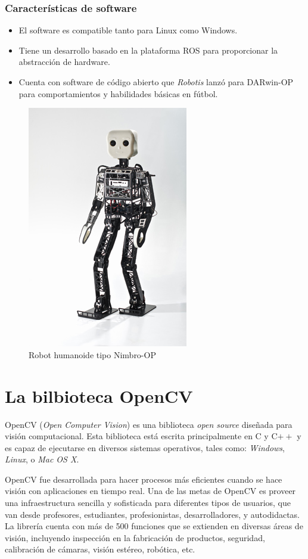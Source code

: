 	\subsubsection*{Características de software}
	\begin{itemize}
	\item El software es compatible tanto para Linux como Windows.
	\item Tiene un desarrollo basado en la plataforma ROS para proporcionar la abstracción de hardware.
	\item Cuenta con software de código abierto que \textit{Robotis} lanzó para DARwin-OP para comportamientos y habilidades básicas en fútbol.
	\end{itemize}
	
\begin{figure}
\centering
\includegraphics[scale=2.0]{images/Nimbro-OP.jpg}
\caption{Robot humanoide tipo Nimbro-OP}
\label{fig:Nimbro-OP}
\end{figure} 
	
	\section{La bilbioteca OpenCV}
OpenCV (\textit{Open Computer Vision}) es una biblioteca \textit{open source} diseñada para visión computacional. Esta biblioteca está escrita principalmente en C y C$++$ y es capaz de ejecutarse en diversos sistemas operativos, tales como: \textit{Windows}, \textit{Linux}, o \textit{Mac OS X}.

OpenCV fue desarrollada para hacer procesos más eficientes cuando se hace visión con aplicaciones en tiempo real. Una de las metas de OpenCV es proveer una infraestructura sencilla y sofisticada para  diferentes tipos de usuarios, que van desde profesores, estudiantes, profesionistas, desarrolladores, y autodidactas. La librería cuenta con más de 500 funciones que se extienden en diversas áreas de visión, incluyendo inspección en la fabricación de productos, seguridad, calibración de cámaras, visión estéreo, robótica, etc.

